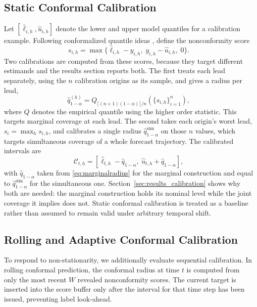\subsection{Static Conformal Calibration}
Let $[\hat{\ell}_{i,h},\hat{u}_{i,h}]$ denote the lower and upper model quantiles for a calibration example. Following conformalized quantile ideas \cite{romano2019cqr}, define the nonconformity score
\begin{equation}
s_{i,h}=\max\{\hat{\ell}_{i,h}-y_{i,h},\; y_{i,h}-\hat{u}_{i,h},\;0\}.
\end{equation}
Two calibrations are computed from these scores, because they target different estimands and the results section reports both. The first treats each lead separately, using the $n$ calibration origins as its sample, and gives a radius per lead,
\begin{equation}
\hat{q}^{(h)}_{1-\alpha}=Q_{\lceil(n+1)(1-\alpha)\rceil/n}\left(\{s_{i,h}\}_{i=1}^{n}\right),
\label{eq:marginalradius}
\end{equation}
where $Q$ denotes the empirical quantile using the higher order statistic. This targets marginal coverage at each lead. The second takes each origin's worst lead, $s_i=\max_h s_{i,h}$, and calibrates a single radius $\hat{q}^{\mathrm{sim}}_{1-\alpha}$ on those $n$ values, which targets simultaneous coverage of a whole forecast trajectory. The calibrated intervals are
\begin{equation}
\mathcal{C}_{t,h}=[\hat{\ell}_{t,h}-\hat{q}_{1-\alpha},\;\hat{u}_{t,h}+\hat{q}_{1-\alpha}],
\end{equation}
with $\hat{q}_{1-\alpha}$ taken from \eqref{eq:marginalradius} for the marginal construction and equal to $\hat{q}^{\mathrm{sim}}_{1-\alpha}$ for the simultaneous one. Section~\ref{sec:results_calibration} shows why both are needed: the marginal construction holds its nominal level while the joint coverage it implies does not. Static conformal calibration is treated as a baseline rather than assumed to remain valid under arbitrary temporal shift.

\subsection{Rolling and Adaptive Conformal Calibration}
To respond to non-stationarity, we additionally evaluate sequential calibration. In rolling conformal prediction, the conformal radius at time $t$ is computed from only the most recent $W$ revealed nonconformity scores. The current target is inserted into the score buffer only after the interval for that time step has been issued, preventing label look-ahead.

